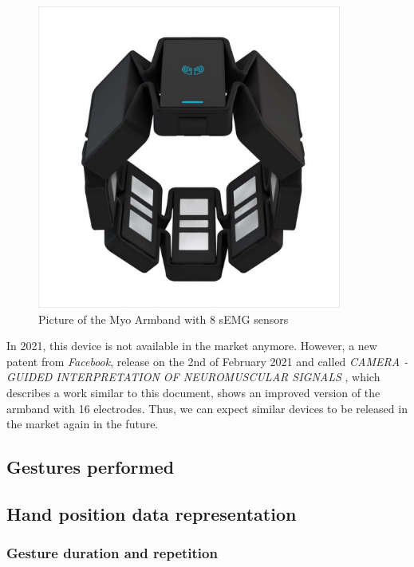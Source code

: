 \documentclass{article}
\begin{document}
\begin{figure}[H]
    \centering
    \includegraphics[width=10cm]{images/myoArmBand.png}
    \caption{Picture of the Myo Armband with 8 sEMG sensors \cite{ref:myoArmBand}}
    \label{fig:myoArmband}
\end{figure}

 In 2021, this device is not available in the market anymore. However, a new patent from \textit{Facebook}, release on the 2nd of February 2021 and called \textit{CAMERA - GUIDED INTERPRETATION OF NEUROMUSCULAR SIGNALS } \cite{ref:facebookPatent}, which describes a work similar to this document, shows an improved version of the armband with 16 electrodes. Thus, we can expect similar devices to be released in the market again in the future.



\subsection{Gestures performed}




\subsection{Hand position data representation}

\subsubsection{Gesture duration and repetition}
\end{document}
